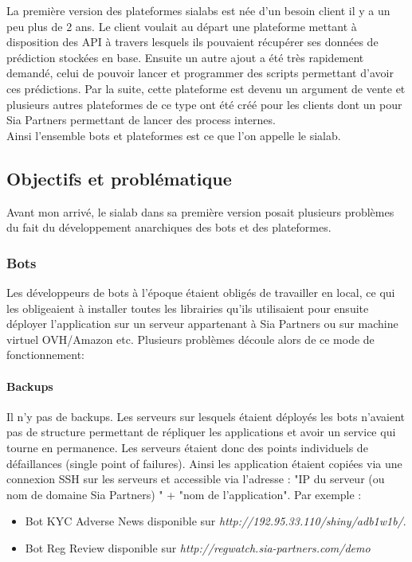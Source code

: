 \documentclass{article} %
\begin{document}
La première version des plateformes sialabs est née d'un besoin client il y a un peu plus de 2 ans. Le client voulait au départ une plateforme mettant à disposition des API à travers lesquels ils pouvaient récupérer ses données de prédiction stockées en base. Ensuite un autre ajout a été très rapidement demandé, celui de pouvoir lancer et programmer des scripts permettant d'avoir ces prédictions. Par la suite, cette plateforme est devenu un argument de vente et plusieurs autres plateformes de ce type ont été créé pour les clients dont un pour Sia Partners permettant de lancer des process internes.\\

Ainsi l'ensemble bots et plateformes est ce que l'on appelle le sialab. 

\subsection{Objectifs et problématique}
Avant mon arrivé, le sialab dans sa première version posait plusieurs problèmes du fait du développement anarchiques des bots et des plateformes.

\subsubsection{Bots\\}
Les développeurs de bots à l'époque étaient obligés de travailler en local, ce qui les obligeaient à installer toutes les librairies qu'ils utilisaient pour ensuite déployer l'application sur un serveur appartenant à Sia Partners ou sur machine virtuel OVH/Amazon etc. Plusieurs problèmes découle alors de ce mode de fonctionnement:

\paragraph{Backups}
Il n'y pas de backups. Les serveurs sur lesquels étaient déployés les bots n'avaient pas de structure permettant de répliquer les applications et avoir un service qui tourne en permanence. Les serveurs étaient donc des points individuels de défaillances (single point of failures). Ainsi les application étaient copiées via une connexion SSH sur les serveurs et accessible via l'adresse : "IP du serveur (ou nom de domaine Sia Partners) " + "nom de l'application". Par exemple : 
\begin{itemize}
	\item Bot KYC Adverse News disponible sur \textit{http://192.95.33.110/shiny/adb1w1b/}.
	\item Bot Reg Review disponible sur \textit{http://regwatch.sia-partners.com/demo}
\end{itemize}
\end{document}
